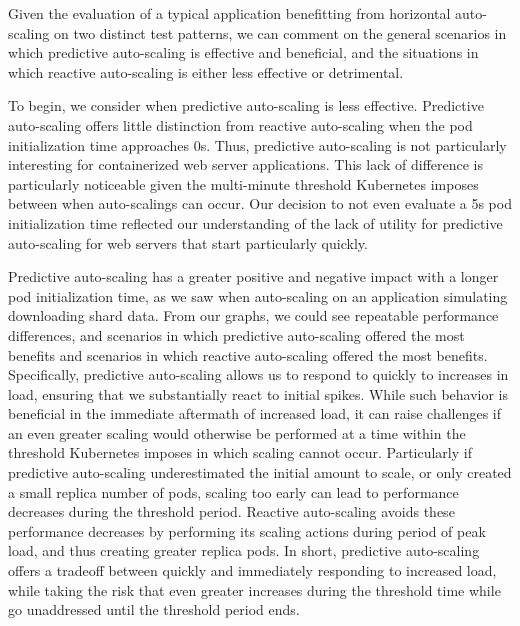 Given the evaluation of a typical application benefitting from horizontal
auto-scaling on two distinct test patterns, we can comment on the general
scenarios in which predictive auto-scaling is effective and beneficial, and the
situations in which reactive auto-scaling is either less effective or
detrimental.

To begin, we consider when predictive auto-scaling is less
effective. Predictive auto-scaling offers little distinction from reactive
auto-scaling when the pod initialization time approaches 0s. Thus, predictive
auto-scaling is not particularly interesting for containerized web server
applications. This lack of difference is particularly noticeable given the
multi-minute threshold Kubernetes imposes between when auto-scalings can occur.
Our decision to not even evaluate a 5s pod initialization time reflected our
understanding of the lack of utility for predictive auto-scaling for web servers
that start particularly quickly.

Predictive auto-scaling has a greater positive and negative impact
with a longer pod initialization time, as we saw when auto-scaling on an
application simulating downloading shard data. From our graphs, we could see
repeatable performance differences, and scenarios in which predictive
auto-scaling offered the most benefits and scenarios in which reactive
auto-scaling offered the most benefits. Specifically, predictive auto-scaling
allows us to respond to quickly to increases in load, ensuring that we
substantially react to initial spikes. While such behavior is beneficial in the
immediate aftermath of increased load, it can raise challenges if an even
greater scaling would otherwise be performed at a time within the
threshold Kubernetes imposes in
which scaling cannot occur. Particularly if predictive auto-scaling
underestimated the initial amount to scale, or only created a small replica
number of pods, scaling too early can lead to
performance decreases during the threshold period. Reactive auto-scaling avoids
these performance decreases by performing its scaling actions during period of
peak load, and thus creating greater replica pods. In short, predictive
auto-scaling offers a tradeoff between quickly and immediately responding to
increased load, while taking the risk that even greater increases during the
threshold time while go unaddressed until the threshold period ends.

